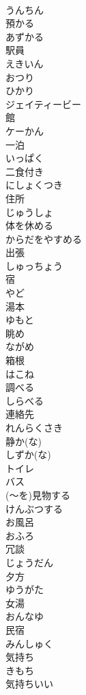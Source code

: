 \documentclass[8pt]{extreport}
\begin{document}
\begin{CJK}{UTF8}{min}
\\	うんちん
\\	預かる	
\\	あずかる
\\	駅員	
\\	えきいん
\\	おつり	
\\	ひかり	
\\	ジェイティービー
\\	館	
\\	ケーかん
\\	一泊	
\\	いっぱく
\\	二食付き	
\\	にしょくつき
\\	住所	
\\	じゅうしょ
\\	体を休める	
\\	からだをやすめる
\\	出張	
\\	しゅっちょう
\\	宿	
\\	やど
\\	湯本	
\\	ゆもと
\\	眺め	
\\	ながめ
\\	箱根	
\\	はこね
\\	調べる	
\\	しらべる
\\	連絡先	
\\	れんらくさき
\\	静か(な)	
\\	しずか(な)
\\	トイレ	
\\	バス	
\\	(～を)見物する	
\\	けんぶつする
\\	お風呂	
\\	おふろ
\\	冗談	
\\	じょうだん
\\	夕方	
\\	ゆうがた
\\	女湯	
\\	おんなゆ
\\	民宿	
\\	みんしゅく
\\	気持ち	
\\	きもち
\\	気持ちいい	

\end{CJK}
\end{document}

